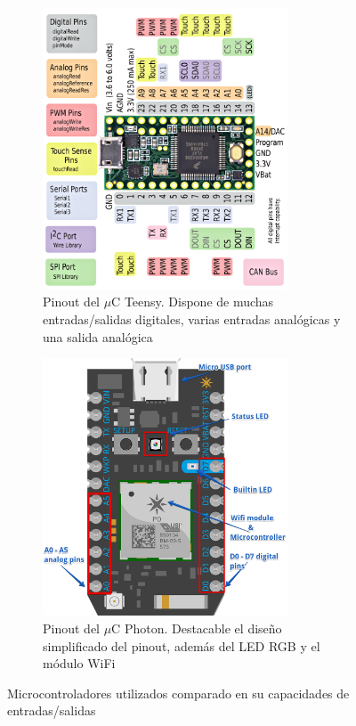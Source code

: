 \begin{figure}[H]
    \begin{subfigure}[b]{0.45\textwidth}
        \centering
        \includegraphics[width=0.8\textwidth]{fig/circuito/teensy32_front_pinout}
        \caption{Pinout del $\mu$C Teensy. Dispone de muchas entradas/salidas digitales, varias entradas analógicas y una salida analógica}
        \label{fig:circuito/teensy}
    \end{subfigure}
    \begin{subfigure}[b]{0.45\textwidth}
        \centering
        \includegraphics[width=0.8\textwidth]{fig/circuito/photon}
        \caption{Pinout del $\mu$C Photon. Destacable el diseño simplificado del pinout, además del LED RGB y el módulo WiFi}
        \label{fig:circuito/photon}
    \end{subfigure}
    \caption{Microcontroladores utilizados comparado en su capacidades de entradas/salidas}
\end{figure}

